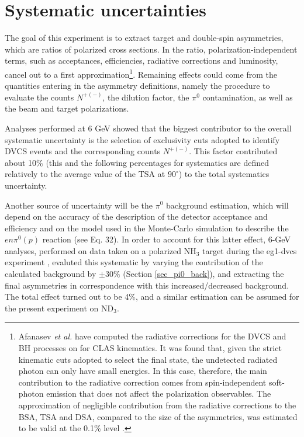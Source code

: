 \section{Systematic uncertainties}\label{sec_syst}
The goal of this experiment is to extract target and double-spin asymmetries, which are ratios of polarized cross sections. In the ratio, polarization-independent terms, such as acceptances, efficiencies, radiative corrections and luminosity, cancel out to a first approximation\footnote{Afanasev {\it et al.} \cite{afanasev} have computed the radiative corrections for the DVCS and BH processes on for CLAS kinematics. It was found that, given the strict kinematic cuts adopted to select the final state, the undetected radiated photon can only have small energies. In this case, therefore, the main contribution to the radiative correction comes from spin-independent soft-photon emission that does not affect the polarization observables. The approximation of negligible contribution from the radiative corrections to the BSA, TSA and DSA, compared to the size of the asymmetries, was estimated to be valid at the 0.1\% level \cite{afanasev}.}. Remaining effects could come from the quantities entering in the asymmetry definitions, namely the procedure to evaluate the counts $N^{+(-)}$, the dilution factor, the $\pi^0$ contamination, as well as the beam and target polarizations. 

Analyses performed at 6 GeV \cite{erin,pisano} showed that the biggest contributor to the overall systematic uncertainty is the selection of exclusivity cuts adopted to identify DVCS events and the corresponding counts $N^{+(-)}$. This factor contributed about 10\% (this and the following percentages for systematics are defined relatively to the average value of the TSA at $90^{\circ}$) to the total systematics uncertainty. 

Another source of uncertainty will be the $\pi^0$ background estimation, which will depend on the accuracy of the description of the detector acceptance and efficiency and on the model used in the Monte-Carlo simulation to describe the $en\pi^0(p)$ reaction (see Eq. 32). In order to account for this latter effect, 6-GeV analyses, performed on data taken on a polarized NH$_3$ target during the eg1-dvcs experiment \cite{erin,pisano}, evaluted this systematic by varying the contribution of the calculated background by $\pm 30\%$ (Section \ref{sec_pi0_back}), and extracting the final asymmetries in correspondence with this increased/decreased background. The total effect turned out to be 4\%, and a similar estimation can be assumed for the present experiment on ND$_3$.

